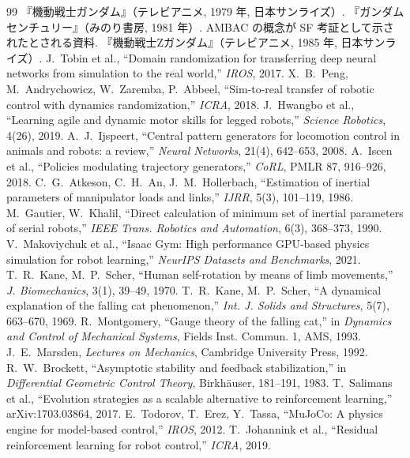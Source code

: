 \documentclass[paper=a4paper,fontsize=10pt,twocolumn,column_gap=2zw,line_length=24zw,number_of_lines=46,head_space=20mm]{jlreq}
\begin{document}
\begin{thebibliography}{99}\footnotesize\setlength{\itemsep}{0pt}
 『機動戦士ガンダム』（テレビアニメ, 1979 年, 日本サンライズ）.
 『ガンダムセンチュリー』（みのり書房, 1981 年）. AMBAC の概念が SF 考証として示されたとされる資料.
 『機動戦士Ζガンダム』（テレビアニメ, 1985 年, 日本サンライズ）.
 J.~Tobin et al., ``Domain randomization for transferring deep neural networks from simulation to the real world,'' \textit{IROS}, 2017.
 X.~B.~Peng, M.~Andrychowicz, W.~Zaremba, P.~Abbeel, ``Sim-to-real transfer of robotic control with dynamics randomization,'' \textit{ICRA}, 2018.
 J.~Hwangbo et al., ``Learning agile and dynamic motor skills for legged robots,'' \textit{Science Robotics}, 4(26), 2019.
 A.~J.~Ijspeert, ``Central pattern generators for locomotion control in animals and robots: a review,'' \textit{Neural Networks}, 21(4), 642--653, 2008.
 A.~Iscen et al., ``Policies modulating trajectory generators,'' \textit{CoRL}, PMLR 87, 916--926, 2018.
 C.~G.~Atkeson, C.~H.~An, J.~M.~Hollerbach, ``Estimation of inertial parameters of manipulator loads and links,'' \textit{IJRR}, 5(3), 101--119, 1986.
 M.~Gautier, W.~Khalil, ``Direct calculation of minimum set of inertial parameters of serial robots,'' \textit{IEEE Trans. Robotics and Automation}, 6(3), 368--373, 1990.
 V.~Makoviychuk et al., ``Isaac Gym: High performance GPU-based physics simulation for robot learning,'' \textit{NeurIPS Datasets and Benchmarks}, 2021.
 T.~R.~Kane, M.~P.~Scher, ``Human self-rotation by means of limb movements,'' \textit{J. Biomechanics}, 3(1), 39--49, 1970.
 T.~R.~Kane, M.~P.~Scher, ``A dynamical explanation of the falling cat phenomenon,'' \textit{Int. J. Solids and Structures}, 5(7), 663--670, 1969.
 R.~Montgomery, ``Gauge theory of the falling cat,'' in \textit{Dynamics and Control of Mechanical Systems}, Fields Inst. Commun. 1, AMS, 1993.
 J.~E.~Marsden, \textit{Lectures on Mechanics}, Cambridge University Press, 1992.
 R.~W.~Brockett, ``Asymptotic stability and feedback stabilization,'' in \textit{Differential Geometric Control Theory}, Birkhäuser, 181--191, 1983.
 T.~Salimans et al., ``Evolution strategies as a scalable alternative to reinforcement learning,'' arXiv:1703.03864, 2017.
 E.~Todorov, T.~Erez, Y.~Tassa, ``MuJoCo: A physics engine for model-based control,'' \textit{IROS}, 2012.
 T.~Johannink et al., ``Residual reinforcement learning for robot control,'' \textit{ICRA}, 2019.
\end{thebibliography}
\end{document}
